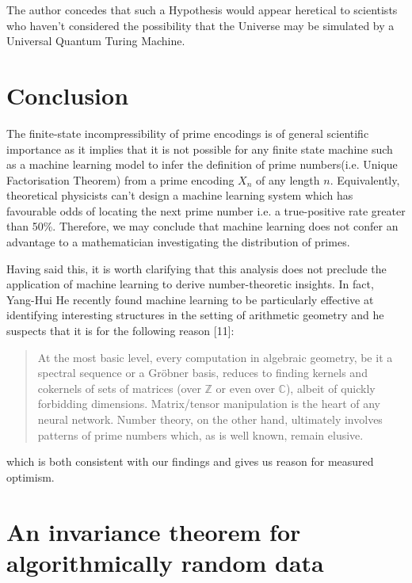 \documentclass{article}
\begin{document}
The author concedes that such a Hypothesis would appear heretical to scientists who haven't considered the possibility that the Universe may be simulated by a Universal Quantum Turing Machine. 

\newpage 

\section{Conclusion}

The finite-state incompressibility of prime encodings is of general scientific importance as it implies that it is not possible for any finite state machine such as a machine learning model to infer the definition of prime numbers(i.e. Unique Factorisation Theorem) from a prime encoding $X_n$ of any length $n$. Equivalently, theoretical physicists can't design a machine learning system which has favourable odds of locating the next prime number i.e. a true-positive rate greater than 50\%. Therefore, we may conclude that machine learning does not confer an advantage to a mathematician investigating the distribution of primes. 

Having said this, it is worth clarifying that this analysis does not preclude the application of machine learning to derive number-theoretic insights. In fact, Yang-Hui He recently found machine learning to be particularly effective at identifying interesting structures in the setting of arithmetic geometry and he suspects that it is for the following reason [11]: 

\begin{quote}
At the most basic level, every computation in algebraic
geometry, be it a spectral sequence or a Gröbner basis, reduces to finding kernels and cokernels of sets of matrices (over $\mathbb{Z}$ or even over $\mathbb{C}$), albeit of quickly forbidding dimensions. Matrix/tensor manipulation is the heart of any neural network. Number theory, on the other hand, ultimately involves patterns of prime numbers which, as is well known, remain elusive.
\end{quote} 

which is both consistent with our findings and gives us reason for measured optimism. 

\newpage 

\appendix

\section{An invariance theorem for algorithmically random data}
\end{document}
